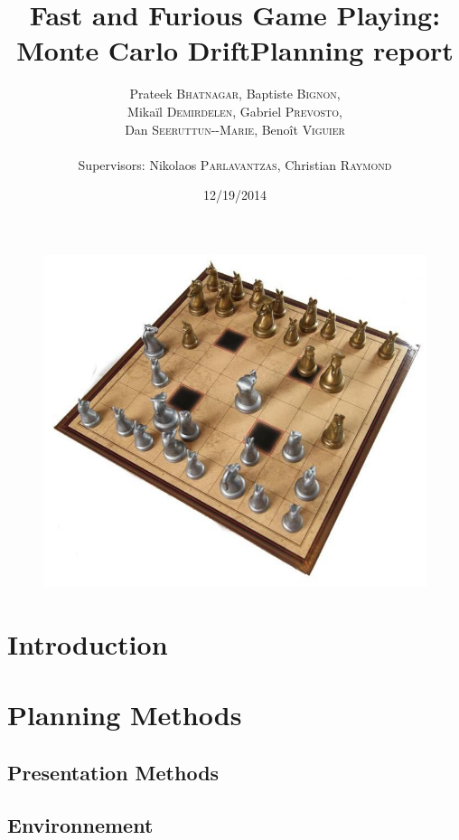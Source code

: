 \documentclass[12pt]{article}
\title{Fast and Furious Game Playing: Monte Carlo Drift\smallbreak Planning report} %
\author{Prateek \textsc{Bhatnagar}, Baptiste \textsc{Bignon}, \\
        Mikaïl \textsc{Demirdelen}, Gabriel \textsc{Prevosto}, \\
        Dan \textsc{Seeruttun-{}-Marie}, Benoît \textsc{Viguier} \\
        \\
        Supervisors: Nikolaos \textsc{Parlavantzas}, Christian \textsc{Raymond}}
\date{12/19/2014}
\begin{document}
\maketitle

\begin{figure}[!h] 
\centerline{\includegraphics[scale=0.50]{Pictures/arimaa}}
\end{figure}
\newpage

\tableofcontents
\newpage


\section{Introduction}						\label{sec:introduction} 	%
\newpage

\section{Planning Methods} \label{sec:PlanningMethods}
	\subsection{Presentation Methods}		\label{sec:PresentationMethods}		%
	\subsection{Environnement}			\label{sec:environnement}	%
\newpage
\end{document}

